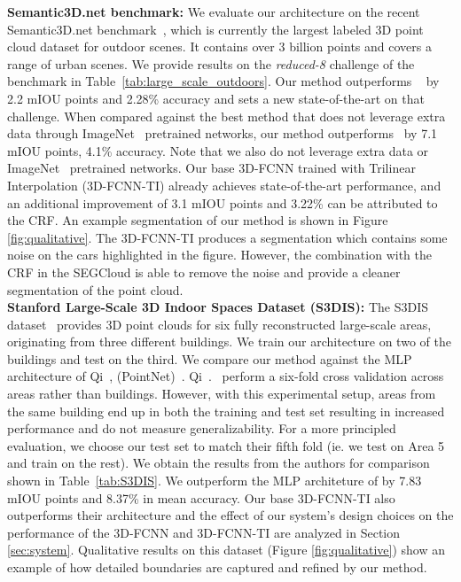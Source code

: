 \documentclass[10pt,twocolumn,letterpaper]{article}
\newcommand{\fccrf}[0]{CRF\xspace}
\newcommand{\ours}[0]{SEGCloud\xspace}
\newcommand{\threedfcnn}[0]{3D-FCNN\xspace}
\begin{document}
\textbf{Semantic3D.net benchmark:}
We evaluate our architecture on the recent Semantic3D.net benchmark~\cite{l3d}, which is currently the largest labeled 3D point cloud dataset for outdoor scenes. It contains over $3$ billion points and covers a range of urban scenes. We provide results on the \textit{reduced-8} challenge of the benchmark in Table~\ref{tab:large_scale_outdoors}. Our method outperforms ~\cite{snapnet} by 2.2 mIOU points and 2.28\% accuracy and sets a new state-of-the-art on that challenge. When compared against the best method that does not leverage extra data through ImageNet~\cite{ILSVRC15} pretrained networks, our method outperforms~\cite{Hackel2016} by 7.1 mIOU points, 4.1\% accuracy. Note that we also do not leverage extra data or ImageNet~\cite{ILSVRC15} pretrained networks. Our base \threedfcnn trained with Trilinear Interpolation (\threedfcnn-TI) already achieves state-of-the-art performance, and an additional improvement of 3.1 mIOU points and 3.22\% can be attributed to the \fccrf. An example segmentation of our method is shown in Figure \ref{fig:qualitative}. The \threedfcnn-TI produces a segmentation which contains some noise on the cars highlighted in the figure. However, the combination with the \fccrf in the \ours is able to remove the noise and provide a cleaner segmentation of the point cloud.\\

\textbf{Stanford Large-Scale 3D Indoor Spaces Dataset (S3DIS): }The S3DIS dataset~\cite{Armeni2016} provides 3D point clouds for six fully reconstructed large-scale areas, originating from three different buildings. We train our architecture on two of the buildings and test on the third. We compare our method against the MLP architecture of Qi~\etal, (PointNet)~\cite{DBLP:journals/corr/QiSMG16}. Qi~\etal.~\cite{DBLP:journals/corr/QiSMG16} perform a six-fold cross validation across areas rather than buildings. However, with this experimental setup, areas from the same building end up in both the training and test set resulting in increased performance and do not measure generalizability. For a more principled evaluation, we choose our test set to match their fifth fold (ie. we test on Area 5 and train on the rest). We obtain the results from the authors for comparison shown in Table~\ref{tab:S3DIS}. We outperform the MLP architeture of \cite{DBLP:journals/corr/QiSMG16} by 7.83 mIOU points and 8.37\% in mean accuracy. Our base \threedfcnn-TI also outperforms their architecture and the effect of our system's design choices on the performance of the \threedfcnn and \threedfcnn-TI are analyzed in Section \ref{sec:system}. Qualitative results on this dataset (Figure \ref{fig:qualitative}) show an example of how detailed boundaries are captured and refined by our method. \\
\end{document}
